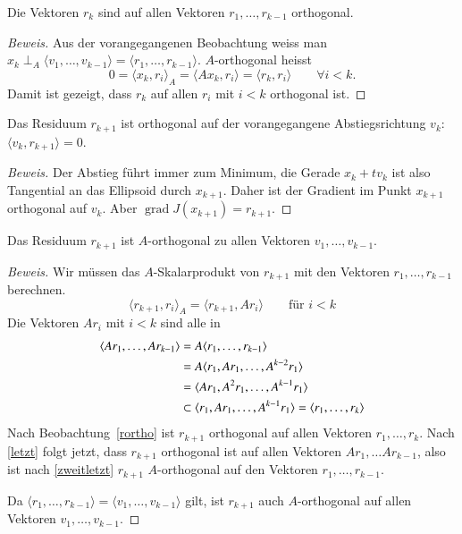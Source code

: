 \documentclass[a4paper,11pt]{article}
\begin{document}
%
%
\begin{beobachtung}
\label{rortho}
Die Vektoren $r_k$ sind auf allen Vektoren $r_1,\dots,r_{k-1}$ 
orthogonal.
\end{beobachtung}

\begin{proof}[Beweis]
Aus der vorangegangenen Beobachtung weiss man
$x_k\perp_A \langle v_1,\dots,v_{k-1}\rangle =
\langle r_1,\dots, r_{k-1}\rangle$.
$A$-orthogonal heisst
\[
0
=
\langle x_k,r_i\rangle_A 
=
\langle Ax_k,r_i\rangle
=
\langle r_k,r_i\rangle
\qquad
\forall i < k.
\]
Damit ist gezeigt, dass $r_k$ auf allen $r_i$ mit $i<k$ orthogonal ist.
\end{proof}

\begin{beobachtung}
Das Residuum $r_{k+1}$ ist orthogonal auf der vorangegangene 
Abstiegsrichtung $v_{k}$: $\langle v_k,r_{k+1}\rangle=0$.
\end{beobachtung}

\begin{proof}[Beweis]
Der Abstieg führt immer zum Minimum, die Gerade $x_k+tv_k$ ist
also Tangential an das Ellipsoid durch $x_{k+1}$.
Daher ist der Gradient im Punkt $x_{k+1}$ orthogonal auf $v_k$.
Aber $\operatorname{grad}J(x_{k+1})=r_{k+1}$.
\end{proof}

\begin{beobachtung}
Das Residuum $r_{k+1}$ ist $A$-orthogonal zu allen Vektoren
$v_1,\dots,v_{k-1}$.
\end{beobachtung}

\begin{proof}[Beweis]
Wir müssen das $A$-Skalarprodukt von $r_{k+1}$ mit den Vektoren
$r_1,\dots,r_{k-1}$ berechnen.
\begin{equation}
\langle r_{k+1},r_i\rangle_A
=
\langle r_{k+1},Ar_i\rangle
\qquad\text{für $i<k$}
\label{zweitletzt}
\end{equation}
Die Vektoren $Ar_i$ mit $i<k$  sind alle in
\begin{align}
\langle Ar_1,\dots,Ar_{k-1}\rangle
&=
A\langle r_1,\dots,r_{k-1}\rangle
\notag
\\
&=
A\langle r_1,Ar_1,\dots,A^{k-2}r_1\rangle
\notag
\\
&=
\langle Ar_1,A^2r_1,\dots,A^{k-1}r_1\rangle
\notag
\\
&\subset
\langle r_1,Ar_1,\dots,A^{k-1}r_1\rangle
=
\langle r_1,\dots,r_{k}\rangle
\label{letzt}
\end{align}
Nach Beobachtung~\ref{rortho} ist $r_{k+1}$ orthogonal auf allen
Vektoren $r_1,\dots,r_{k}$. 
Nach \eqref{letzt} folgt jetzt, dass $r_{k+1}$ orthogonal ist auf allen
Vektoren $Ar_1,\dots Ar_{k-1}$, also ist nach \eqref{zweitletzt}
$r_{k+1}$ $A$-orthogonal auf den Vektoren $r_1,\dots,r_{k-1}$.

Da $\langle r_1,\dots,r_{k-1}\rangle = \langle v_1,\dots,v_{k-1}\rangle$ 
gilt, ist $r_{k+1}$ auch $A$-orthogonal auf allen Vektoren
$v_1,\dots,v_{k-1}$.
\end{proof}



\end{document}
